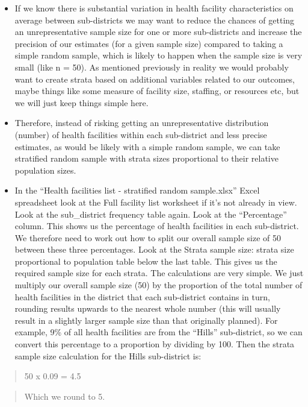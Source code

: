 \documentclass[
]{book}
\begin{document}
\begin{itemize}
\item
  If we know there is substantial variation in health facility characteristics on average between sub-districts we may want to reduce the chances of getting an unrepresentative sample size for one or more sub-districts and increase the precision of our estimates (for a given sample size) compared to taking a simple random sample, which is likely to happen when the sample size is very small (like n = 50). As mentioned previously in reality we would probably want to create strata based on additional variables related to our outcomes, maybe things like some measure of facility size, staffing, or resources etc, but we will just keep things simple here.
\item
  Therefore, instead of risking getting an unrepresentative distribution (number) of health facilities within each sub-district and less precise estimates, as would be likely with a simple random sample, we can take stratified random sample with strata sizes proportional to their relative population sizes.
\item
  In the ``Health facilities list - stratified random sample.xlsx'' Excel spreadsheet look at the Full facility list worksheet if it's not already in view. Look at the sub\_district frequency table again. Look at the ``Percentage'' column. This shows us the percentage of health facilities in each sub-district. We therefore need to work out how to split our overall sample size of 50 between these three percentages. Look at the Strata sample size: strata size proportional to population table below the last table. This gives us the required sample size for each strata. The calculations are very simple. We just multiply our overall sample size (50) by the proportion of the total number of health facilities in the district that each sub-district contains in turn, rounding results upwards to the nearest whole number (this will usually result in a slightly larger sample size than that originally planned). For example, 9\% of all health facilities are from the ``Hills'' sub-district, so we can convert this percentage to a proportion by dividing by 100. Then the strata sample size calculation for the Hills sub-district is:
\end{itemize}

\begin{quote}
50 x 0.09 = 4.5
\end{quote}

\begin{quote}
Which we round to 5.
\end{quote}
\end{document}
